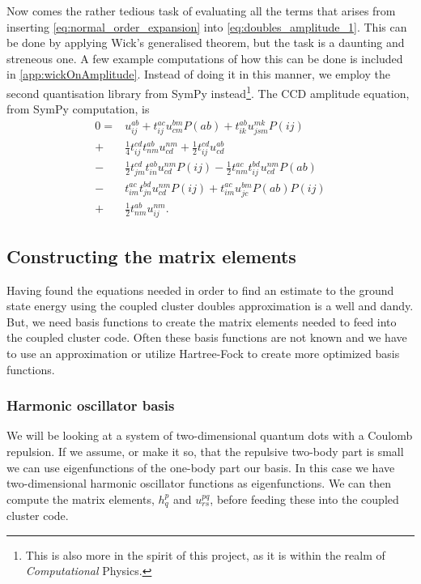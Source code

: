 \documentclass[
    a4paper, aps, twocolumn, floatfix, superscriptaddress,
    nofootinbib]{revtex4-1}
\newcommand{\1}{\mathds{1}}
\begin{document}
		Now comes the rather tedious task of evaluating all the terms 
		that arises from inserting \autoref{eq:normal_order_expansion}
		into \autoref{eq:doubles_amplitude_1}. This can be done by applying
		Wick's generalised theorem, but the task is a daunting and streneous one.
		A few example computations of how this can be done is included in
		\autoref{app:wickOnAmplitude}.
	 	Instead of doing it in this manner, we employ the second quantisation library
	 	from SymPy instead\footnote{This is also more in the spirit of this project,
	 	as it is within the realm of \emph{Computational} Physics.}.
		The CCD amplitude equation, from SymPy computation, is 
		\begin{equation}
		\begin{aligned}
			0 =& u^{ab}_{ij} + t^{ac}_{ij} u^{bm}_{cm} P(ab) + t^{ab}_{ik} u^{mk}_{jsm} P(ij) \\
				 +& \frac{1}{4}t^{cd}_{ij} t^{ab}_{nm} u^{nm}_{cd} + \frac{1}{2}t^{cd}_{ij} u^{ab}_{cd} \\
				 -& \frac{1}{2}t^{cd}_{jm} t^{ab}_{in} u^{nm}_{cd} P(ij) - \frac{1}{2}t^{ac}_{nm} t^{bd}_{ij} u^{nm}_{cd} P(ab) \\
				 -& t^{ac}_{im} t^{bd}_{jn} u^{nm}_{cd} P(ij) + t^{ac}_{im} u^{bm}_{jc} P(ab) P(ij) \\
				 +& \frac{1}{2}t^{ab}_{nm} u^{nm}_{ij}. 
		\end{aligned}
		\end{equation}
		
    \subsection{Constructing the matrix elements}
        Having found the equations needed in order to find an estimate to the
        ground state energy using the coupled cluster doubles approximation is a
        well and dandy. But, we need basis functions to create the matrix
        elements needed to feed into the coupled cluster code.  Often these
        basis functions are not known and we have to use an approximation or
        utilize Hartree-Fock to create more optimized basis functions.

        \subsubsection{Harmonic oscillator basis}
            We will be looking at a system of two-dimensional quantum dots with
            a Coulomb repulsion.  If we assume, or make it so, that the
            repulsive two-body part is small we can use eigenfunctions of the
            one-body part our basis. In this case we have two-dimensional
            harmonic oscillator functions as eigenfunctions. We can then compute
            the matrix elements, $h_q^p$ and $u_{rs}^{pq}$, before feeding these
            into the coupled cluster code.
\end{document}
